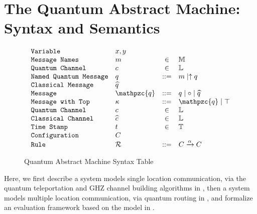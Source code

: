 \section{The Quantum Abstract Machine:  Syntax and Semantics} \label{sec:qam}

\begin{figure}[t]
{\small
  \[\begin{array}{llcl} 
      \texttt{Variable} & x,y \\
      \texttt{Message Names} & m &\in& \mathbb{M}\\
    \texttt{Quantum Channel} & c &\in& \Ls\\
      \texttt{Named Quantum Message} & q &::=& m\mid \up{q}\\
      \texttt{Classical Message} & \wideparen{q}\\
      \texttt{Message} & \mathpzc{q} &::=& q \mid \circ \mid \wideparen{q} \\
      \texttt{Message with Top} & \kappa &::=& \mathpzc{q} \mid \top \\
    \texttt{Quantum Channel} & c &\in& \Ls\\
    \texttt{Classical Channel} & \wideparen{c} &\in& \Ls\\
    \texttt{Time Stamp} & t &\in& \mathbb{T}\\
\ignore{
    \texttt{Timed Label} & \alpha^t &::=& \qsend{p}{c}{m}^{t}\\
    \texttt{Label} & \iota &::=& c.m \mid p.c.m \mid \alpha^t \mid \emptyset\\
}
      \texttt{Configuration} & C & \\
      \texttt{Rule} & \rules & ::= & C \xrightarrow{\alpha} C 
    \end{array}
  \]
}
\caption{Quantum Abstract Machine Syntax Table}
  \label{fig:q-pi-syntax}
\end{figure}

Here, we first describe a system models single location communication, via the quantum teleportation and GHZ channel building algorithms in , then a system models multiple location communication, via quantum routing in ,
and formalize an evaluation framework based on the model in .

